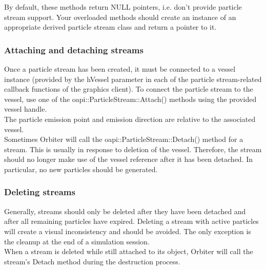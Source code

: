 \documentclass[Orbiter Developer Manual.tex]{subfiles}
\begin{document}
\noindent
By default, these methods return NULL pointers, i.e. don't provide particle stream support. Your overloaded methods should create an instance of an appropriate derived particle stream class and return a pointer to it.



\subsubsection{Attaching and detaching streams}
Once a particle stream has been created, it must be connected to a vessel instance (provided by the hVessel parameter in each of the particle stream-related callback functions of the graphics client). To connect the particle stream to the vessel, use one of the oapi::ParticleStream::Attach() methods using the provided vessel handle.\\
The particle emission point and emission direction are relative to the associated vessel.\\
Sometimes Orbiter will call the oapi::ParticleStream::Detach() method for a stream. This is usually in response to deletion of the vessel. Therefore, the stream should no longer make use of the vessel reference after it has been detached. In particular, no new particles should be generated.



\subsubsection{Deleting streams}
Generally, streams should only be deleted after they have been detached and after all remaining particles have expired. Deleting a stream with active particles will create a visual inconsistency and should be avoided. The only exception is the cleanup at the end of a simulation session.\\
When a stream is deleted while still attached to its object, Orbiter will call the stream's Detach method during the destruction process.
\end{document}

